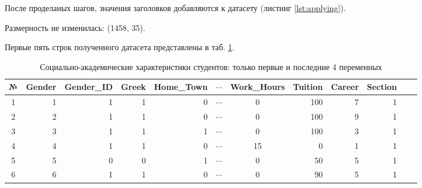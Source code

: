 После проделаных шагов, значения заголовков добавляются к датасету  (листинг \ref{lst:applying}).


Размерность не изменилась: (1458, 35).

Первые пять строк полученного датасета представлены в таб. \ref{tab:students_summary}.

\begin{table}[ht]
	\centering
	\caption{Социально-академические характеристики студентов: только первые и последние 4 переменных}
	\scriptsize
	\setlength{\tabcolsep}{6pt}
	\begin{tabular}{|c|r r r r r c r r r r r|}
		\hline
		№   & Gender & Gender\_ID & Greek & Home\_Town & $\cdots$ & Work\_Hours & Tuition & Career & Section \\
		\hline
		1 & 1      & 1          & 1     & 0          & $\cdots$   & 0          & 100     & 7      & 1       \\
		2 & 2      & 1          & 1     & 0          & $\cdots$ & 0          & 100     & 9      & 1       \\
		3 & 3      & 1          & 1     & 1          & $\cdots$& 0          & 100     & 3      & 1       \\
		4 & 4      & 1          & 1     & 0          & $\cdots$ &15         & 0       & 1      & 1       \\
		5 & 5      & 0          & 0     & 1          & $\cdots$     & 0          & 50      & 5      & 1       \\
		6 & 6      & 1          & 1     & 0          & $\cdots$       & 0          & 90      & 5      & 1       \\
		\hline
	\end{tabular}
	\label{tab:students_summary}
\end{table}


